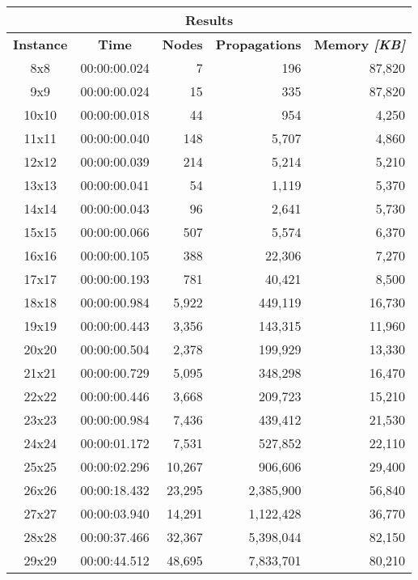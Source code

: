 
\begin{center}
    \begin{tabular}{|c|c|r|r|r|}
        \hline
        \multicolumn{5}{|c|}{\textbf{Results}} \\
        \hline
        \textbf{Instance} & \textbf{Time} & \textbf{Nodes} & \textbf{Propagations} & \textbf{Memory \textit{[KB]}} \\
        
        \hline
		8x8 & 00:00:00.024 & 7 & 196 & 87,820 \\ \hline
		9x9 & 00:00:00.024 & 15 & 335 & 87,820 \\ \hline
		10x10 & 00:00:00.018 & 44 & 954 & 4,250 \\ \hline
		11x11 & 00:00:00.040 & 148 & 5,707 & 4,860 \\ \hline
		12x12 & 00:00:00.039 & 214 & 5,214 & 5,210 \\ \hline
		13x13 & 00:00:00.041 & 54 & 1,119 & 5,370 \\ \hline
		14x14 & 00:00:00.043 & 96 & 2,641 & 5,730 \\ \hline
		15x15 & 00:00:00.066 & 507 & 5,574 & 6,370 \\ \hline
		16x16 & 00:00:00.105 & 388 & 22,306 & 7,270 \\ \hline
		17x17 & 00:00:00.193 & 781 & 40,421 & 8,500 \\ \hline
		18x18 & 00:00:00.984 & 5,922 & 449,119 & 16,730 \\ \hline
		19x19 & 00:00:00.443 & 3,356 & 143,315 & 11,960 \\ \hline
		20x20 & 00:00:00.504 & 2,378 & 199,929 & 13,330 \\ \hline
		21x21 & 00:00:00.729 & 5,095 & 348,298 & 16,470 \\ \hline
		22x22 & 00:00:00.446 & 3,668 & 209,723 & 15,210 \\ \hline
		23x23 & 00:00:00.984 & 7,436 & 439,412 & 21,530 \\ \hline
		24x24 & 00:00:01.172 & 7,531 & 527,852 & 22,110 \\ \hline
		25x25 & 00:00:02.296 & 10,267 & 906,606 & 29,400 \\ \hline
		26x26 & 00:00:18.432 & 23,295 & 2,385,900 & 56,840 \\ \hline
		27x27 & 00:00:03.940 & 14,291 & 1,122,428 & 36,770 \\ \hline
		28x28 & 00:00:37.466 & 32,367 & 5,398,044 & 82,150 \\ \hline
		29x29 & 00:00:44.512 & 48,695 & 7,833,701 & 80,210 \\ \hline

\end{tabular}
\end{center}
